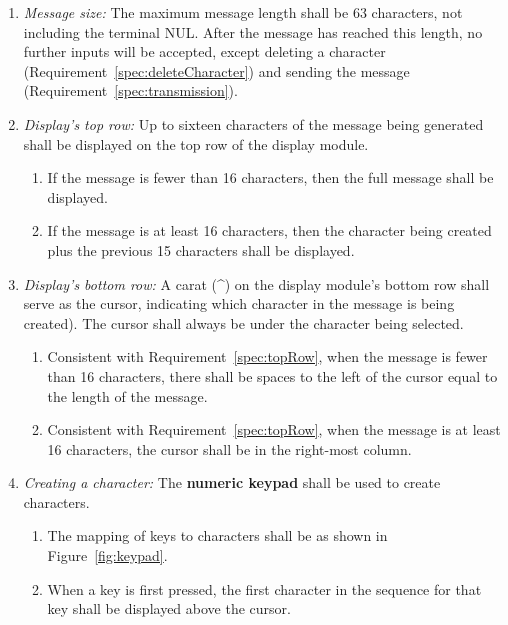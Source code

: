 \begin{enumerate}
    \item \textit{Message size:} \label{spec:messageLength} The maximum message length shall be 63 characters, not including the terminal NUL\@.
        After the message has reached this length, no further inputs will be accepted, except deleting a character (Requirement~\ref{spec:deleteCharacter}) and sending the message (Requirement~\ref{spec:transmission}).
    \item \textit{Display's top row:} \label{spec:topRow} Up to sixteen characters of the message being generated shall be displayed on the top row of the display module.
        \begin{enumerate}
            \item If the message is fewer than 16 characters, then the full message shall be displayed.
            \item If the message is at least 16 characters, then the character being created plus the previous 15 characters shall be displayed.
        \end{enumerate}
    \item \textit{Display's bottom row:} \label{spec:bottomRow} A carat (\^{}) on the display module's bottom row shall serve as the cursor, indicating which character in the message is being created).
        The cursor shall always be under the character being selected.
        \begin{enumerate}
            \item Consistent with Requirement~\ref{spec:topRow}, when the message is fewer than 16 characters, there shall be spaces to the left of the cursor equal to the length of the message.
            \item Consistent with Requirement~\ref{spec:topRow}, when the message is at least 16 characters, the cursor shall be in the right-most column.
        \end{enumerate}
    \item \textit{Creating a character:}  \label{spec:createCharacter} The \textbf{numeric keypad} shall be used to create characters.
        \begin{enumerate}
            \item \label{spec:keypad} The mapping of keys to characters shall be as shown in Figure~\ref{fig:keypad}.
            \item \label{spec:firstPress} When a key is first pressed, the first character in the sequence for that key shall be displayed above the cursor.

\end{enumerate}
\end{enumerate}
